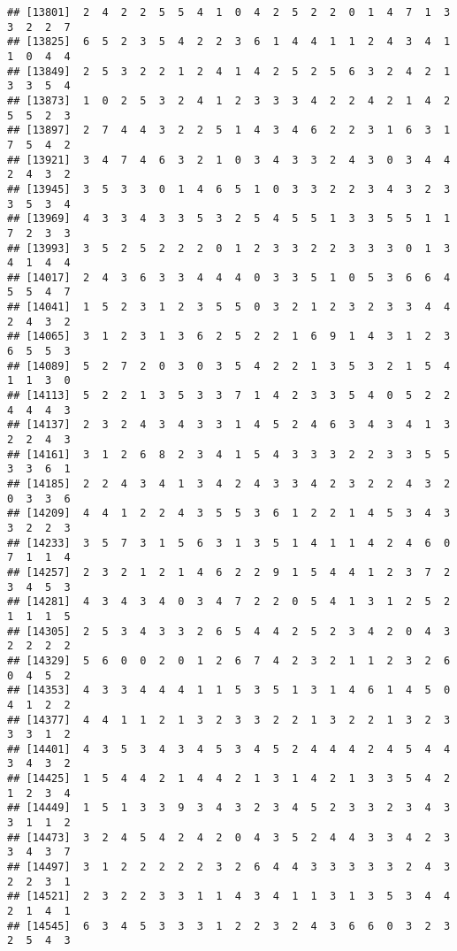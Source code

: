 \documentclass[
]{article}
\begin{document}
\begin{verbatim}
## [13801]  2  4  2  2  5  5  4  1  0  4  2  5  2  2  0  1  4  7  1  3  3  2  2  7
## [13825]  6  5  2  3  5  4  2  2  3  6  1  4  4  1  1  2  4  3  4  1  1  0  4  4
## [13849]  2  5  3  2  2  1  2  4  1  4  2  5  2  5  6  3  2  4  2  1  3  3  5  4
## [13873]  1  0  2  5  3  2  4  1  2  3  3  3  4  2  2  4  2  1  4  2  5  5  2  3
## [13897]  2  7  4  4  3  2  2  5  1  4  3  4  6  2  2  3  1  6  3  1  7  5  4  2
## [13921]  3  4  7  4  6  3  2  1  0  3  4  3  3  2  4  3  0  3  4  4  2  4  3  2
## [13945]  3  5  3  3  0  1  4  6  5  1  0  3  3  2  2  3  4  3  2  3  3  5  3  4
## [13969]  4  3  3  4  3  3  5  3  2  5  4  5  5  1  3  3  5  5  1  1  7  2  3  3
## [13993]  3  5  2  5  2  2  2  0  1  2  3  3  2  2  3  3  3  0  1  3  4  1  4  4
## [14017]  2  4  3  6  3  3  4  4  4  0  3  3  5  1  0  5  3  6  6  4  5  5  4  7
## [14041]  1  5  2  3  1  2  3  5  5  0  3  2  1  2  3  2  3  3  4  4  2  4  3  2
## [14065]  3  1  2  3  1  3  6  2  5  2  2  1  6  9  1  4  3  1  2  3  6  5  5  3
## [14089]  5  2  7  2  0  3  0  3  5  4  2  2  1  3  5  3  2  1  5  4  1  1  3  0
## [14113]  5  2  2  1  3  5  3  3  7  1  4  2  3  3  5  4  0  5  2  2  4  4  4  3
## [14137]  2  3  2  4  3  4  3  3  1  4  5  2  4  6  3  4  3  4  1  3  2  2  4  3
## [14161]  3  1  2  6  8  2  3  4  1  5  4  3  3  3  2  2  3  3  5  5  3  3  6  1
## [14185]  2  2  4  3  4  1  3  4  2  4  3  3  4  2  3  2  2  4  3  2  0  3  3  6
## [14209]  4  4  1  2  2  4  3  5  5  3  6  1  2  2  1  4  5  3  4  3  3  2  2  3
## [14233]  3  5  7  3  1  5  6  3  1  3  5  1  4  1  1  4  2  4  6  0  7  1  1  4
## [14257]  2  3  2  1  2  1  4  6  2  2  9  1  5  4  4  1  2  3  7  2  3  4  5  3
## [14281]  4  3  4  3  4  0  3  4  7  2  2  0  5  4  1  3  1  2  5  2  1  1  1  5
## [14305]  2  5  3  4  3  3  2  6  5  4  4  2  5  2  3  4  2  0  4  3  2  2  2  2
## [14329]  5  6  0  0  2  0  1  2  6  7  4  2  3  2  1  1  2  3  2  6  0  4  5  2
## [14353]  4  3  3  4  4  4  1  1  5  3  5  1  3  1  4  6  1  4  5  0  4  1  2  2
## [14377]  4  4  1  1  2  1  3  2  3  3  2  2  1  3  2  2  1  3  2  3  3  3  1  2
## [14401]  4  3  5  3  4  3  4  5  3  4  5  2  4  4  4  2  4  5  4  4  3  4  3  2
## [14425]  1  5  4  4  2  1  4  4  2  1  3  1  4  2  1  3  3  5  4  2  1  2  3  4
## [14449]  1  5  1  3  3  9  3  4  3  2  3  4  5  2  3  3  2  3  4  3  3  1  1  2
## [14473]  3  2  4  5  4  2  4  2  0  4  3  5  2  4  4  3  3  4  2  3  3  4  3  7
## [14497]  3  1  2  2  2  2  2  3  2  6  4  4  3  3  3  3  3  2  4  3  2  2  3  1
## [14521]  2  3  2  2  3  3  1  1  4  3  4  1  1  3  1  3  5  3  4  4  2  1  4  1
## [14545]  6  3  4  5  3  3  3  1  2  2  3  2  4  3  6  6  0  3  2  3  2  5  4  3

\end{verbatim}
\end{document}
